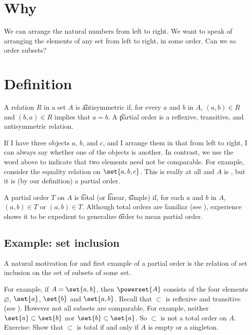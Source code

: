 

\section*{Why}

We can arrange the natural numbers from left to right.
We want to speak of arranging the elements of any set from left to right, in some order.
Can we so order subsets?

\section*{Definition}

A relation $R$ in a set $A$ is \t{antisymmetric} if, for every $a$ and $b$ in $A$, $(a, b) \in R$ and $(b, a) \in R$ implies that $a = b$.
A \t{partial order} is a reflexive, transitive, and antisymmetric relation.

If I have three objects $a$, $b$, and $c$, and I arrange them in that  from left to right, I can always say whether one of the objects is  another.
In contrast, we use the word  above to indicate that two elements need not be comparable.
For example, consider the equality relation on $\set{a, b, c}$.
This is really  at all and $A$ is , but it is (by our definition) a partial order.

A partial order $T$ on $A$ is \t{total} (or \t{linear}, \t{simple}) if, for each $a$ and $b$ in $A$, $(a, b) \in T$ or $(a, b) \in T$.
Although total orders are familiar (see ), experience shows it to be expedient to generalize \t{order} to mean partial order.

\subsection*{Example: set inclusion}

A natural motivation for and first example of a partial order is the relation of set inclusion on the set of subsets of some set.

For example, if $A = \set{a, b}$, then $\powerset{A}$ consists of the four elements $\varnothing$, $\set{a}$, $\set{b}$ and $\set{a,b}$.
Recall that $\subset$ is reflexive and transitive (see ).
However not all subsets are comparable.
For example, neither $\set{a} \subset \set{b}$ nor $\set{b} \subset \set{a}$.
So $\subset$ is not a total order on $A$.
Exercise: Show that $\subset$ is total if and only if $A$ is empty or a singleton.

